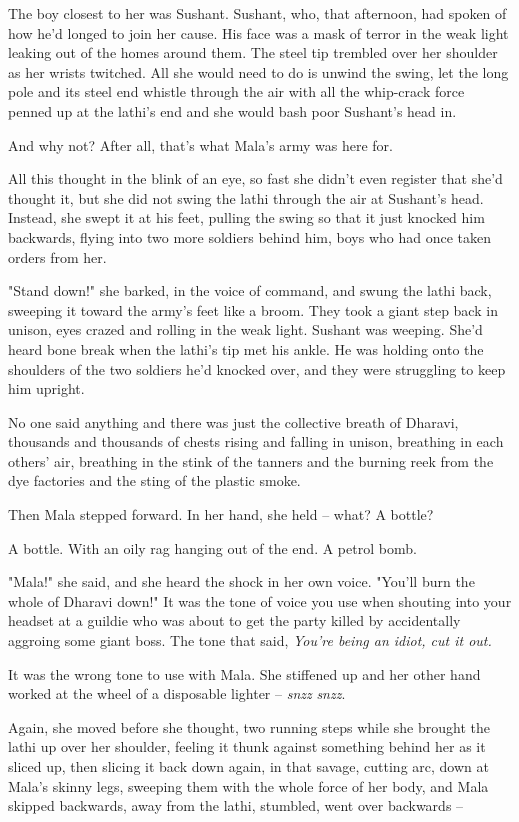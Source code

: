 The boy closest to her was Sushant. Sushant, who, that afternoon,
had spoken of how he'd longed to join her cause. His face was a
mask of terror in the weak light leaking out of the homes around
them. The steel tip trembled over her shoulder as her wrists
twitched. All she would need to do is unwind the swing, let the
long pole and its steel end whistle through the air with all the
whip-crack force penned up at the lathi's end and she would bash
poor Sushant's head in.

And why not? After all, that's what Mala's army was here for.

All this thought in the blink of an eye, so fast she didn't even
register that she'd thought it, but she did not swing the lathi
through the air at Sushant's head. Instead, she swept it at his
feet, pulling the swing so that it just knocked him backwards,
flying into two more soldiers behind him, boys who had once taken
orders from her.

"Stand down!" she barked, in the voice of command, and swung the
lathi back, sweeping it toward the army's feet like a broom. They
took a giant step back in unison, eyes crazed and rolling in the
weak light. Sushant was weeping. She'd heard bone break when the
lathi's tip met his ankle. He was holding onto the shoulders of the
two soldiers he'd knocked over, and they were struggling to keep
him upright.

No one said anything and there was just the collective breath of
Dharavi, thousands and thousands of chests rising and falling in
unison, breathing in each others' air, breathing in the stink of
the tanners and the burning reek from the dye factories and the
sting of the plastic smoke.

Then Mala stepped forward. In her hand, she held -- what? A
bottle?

A bottle. With an oily rag hanging out of the end. A petrol bomb.

"Mala!" she said, and she heard the shock in her own voice. "You'll
burn the whole of Dharavi down!" It was the tone of voice you use
when shouting into your headset at a guildie who was about to get
the party killed by accidentally aggroing some giant boss. The tone
that said, \emph{You're being an idiot, cut it out.}

It was the wrong tone to use with Mala. She stiffened up and her
other hand worked at the wheel of a disposable lighter --
\emph{snzz} \emph{snzz}.

Again, she moved before she thought, two running steps while she
brought the lathi up over her shoulder, feeling it thunk against
something behind her as it sliced up, then slicing it back down
again, in that savage, cutting arc, down at Mala's skinny legs,
sweeping them with the whole force of her body, and Mala skipped
backwards, away from the lathi, stumbled, went over backwards --

